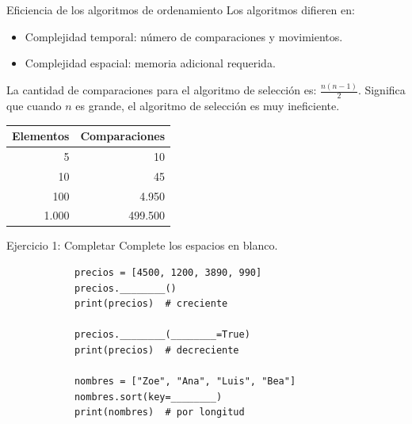 \documentclass{beamer}
\begin{document}
    \begin{frame}{Eficiencia de los algoritmos de ordenamiento}
        Los algoritmos difieren en:
        \begin{itemize}
            \item Complejidad temporal: número de comparaciones y movimientos.
            \item Complejidad espacial: memoria adicional requerida.
        \end{itemize}
        La cantidad de comparaciones para el algoritmo de selección es: \textbf{$\frac{n(n-1)}{2}$}.
        Significa que cuando $n$ es grande, el algoritmo de selección es muy ineficiente.

        \vspace{0.5em}
        \renewcommand{\arraystretch}{1.3}
        \begin{center}
            \footnotesize
            \begin{tabular}{@{}r r@{}}
                \toprule
                \textbf{Elementos} & \textbf{Comparaciones} \\
                \midrule
                5 & 10 \\
                10 & 45 \\
                100 & 4.950 \\
                1.000 & 499.500 \\
                \bottomrule
            \end{tabular}
        \end{center}
    \end{frame}


    \begin{frame}[fragile, t]{Ejercicio 1: Completar}
        Complete los espacios en blanco.
        \begin{verbatim}
            precios = [4500, 1200, 3890, 990]
            precios.________()
            print(precios)  # creciente

            precios.________(________=True)
            print(precios)  # decreciente

            nombres = ["Zoe", "Ana", "Luis", "Bea"]
            nombres.sort(key=________)
            print(nombres)  # por longitud
        \end{verbatim}
    \end{frame}
\end{document}
